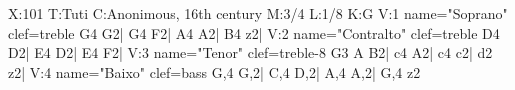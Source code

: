 X:101
T:Tuti
C:Anonimous, 16th century
M:3/4
L:1/8
K:G
V:1 name="Soprano" clef=treble
G4 G2| G4 F2| A4 A2| B4 z2|
V:2 name="Contralto" clef=treble
D4 D2| E4 D2| E4 F2|
V:3 name="Tenor" clef=treble-8
G3 A B2| c4 A2| c4 c2| d2 z2|
V:4 name="Baixo" clef=bass
G,4 G,2| C,4 D,2| A,4 A,2| G,4 z2
